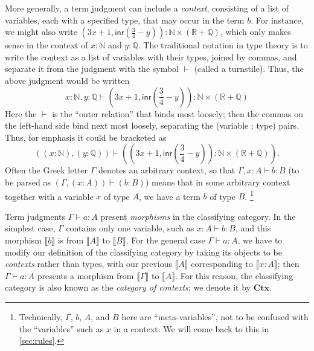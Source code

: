 \documentclass[12pt]{article}
\def\m#1{\llbracket#1\rrbracket}
\def\N{\mathbb{N}}
\def\Q{\mathbb{Q}}
\def\R{\mathbb{R}}
\def\types{\vdash}
\def\Ctx{\mathbf{Ctx}}
\numberwithin{equation}{section}
\begin{document}
More generally, a term judgment can include a \emph{context}, consisting of a list of variables, each with a specified type, that may occur in the term $b$.
For instance, we might also write $(3x+1, \mathsf{inr}(\frac{3}{4}-y)) : \N\times (\R+\Q)$, which only makes sense in the context of $x:\N$ and $y:\Q$.
The traditional notation in type theory is to write the context as a list of variables with their types, joined by commas, and separate it from the judgment with the symbol $\types$ (called a turnstile).
Thus, the above judgment would be written
\[ x:\N, y:\Q \types (3x+1, \mathsf{inr}(\textstyle\frac{3}{4}-y)) : \N\times (\R+\Q) \]
Here the $\types$ is the ``outer relation'' that binds most loosely; then the commas on the left-hand side bind next most loosely, separating the (variable : type) pairs.
Thus, for emphasis it could be bracketed as
\[ ((x:\N), (y:\Q)) \types ((3x+1, \mathsf{inr}(\textstyle\frac{3}{4}-y)) : \N\times (\R+\Q)). \]
Often the Greek letter $\Gamma$ denotes an arbitrary context, so that $\Gamma, x:A \types b:B$ (to be parsed as $(\Gamma, (x:A)) \types (b:B)$) means that in some arbitrary context together with a variable $x$ of type $A$, we have a term $b$ of type $B$.%
\footnote{Technically, $\Gamma$, $b$, $A$, and $B$ here are ``meta-variables'', not to be confused with the ``variables'' such as $x$ in a context.  We will come back to this in \cref{sec:rules}.}

Term judgments $\Gamma \types a:A$ present \emph{morphisms} in the classifying category.
In the simplest case, $\Gamma$ contains only one variable, such as $x:A \types b:B$, and this morphism $\m b$ is from $\m A$ to $\m B$.
For the general case $\Gamma \types a:A$, we have to modify our definition of the classifying category by taking its objects to be \emph{contexts} rather than types, with our previous $\m A$ corresponding to $\m{x:A}$; then %
$\Gamma \types a:A$ presents a morphism from $\m \Gamma$ to $\m{A}$.
For this reason, the classifying category is also known as the \emph{category of contexts}; we denote it by $\Ctx$.
\end{document}
